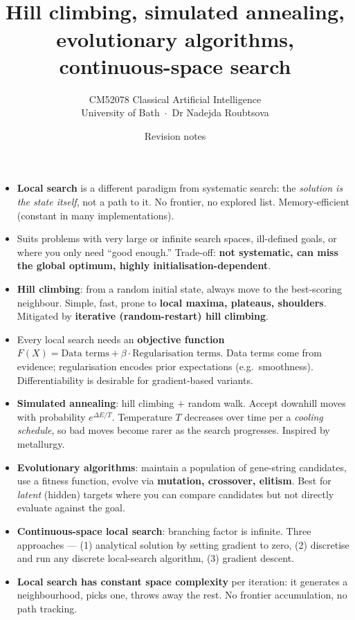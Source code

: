 \documentclass[11pt, a4paper]{article}
\title{\vspace{-1cm}{\Huge\bfseries Week 3 — Local Search Algorithms} \\[0.4em]{\large Hill climbing, simulated annealing, evolutionary algorithms, continuous-space search}}
\author{\large CM52078 Classical Artificial Intelligence \\[0.2em]\normalsize University of Bath \,$\cdot$\, Dr Nadejda Roubtsova}
\date{Revision notes}
\begin{document}
\maketitle
\thispagestyle{empty}

\vspace{1em}

\begin{tldrbox}
\begin{itemize}[leftmargin=*]
  \item \textbf{Local search} is a different paradigm from systematic search: the \emph{solution is the state itself}, not a path to it. No frontier, no explored list. Memory-efficient (constant in many implementations).
  \item Suits problems with very large or infinite search spaces, ill-defined goals, or where you only need ``good enough.'' Trade-off: \textbf{not systematic, can miss the global optimum, highly initialisation-dependent}.
  \item \textbf{Hill climbing}: from a random initial state, always move to the best-scoring neighbour. Simple, fast, prone to \textbf{local maxima, plateaus, shoulders}. Mitigated by \textbf{iterative (random-restart) hill climbing}.
  \item Every local search needs an \textbf{objective function} $F(X) = \text{Data terms} + \beta \cdot \text{Regularisation terms}$. Data terms come from evidence; regularisation encodes prior expectations (e.g.\ smoothness). Differentiability is desirable for gradient-based variants.
  \item \textbf{Simulated annealing}: hill climbing $+$ random walk. Accept downhill moves with probability $e^{\Delta E / T}$. Temperature $T$ decreases over time per a \emph{cooling schedule}, so bad moves become rarer as the search progresses. Inspired by metallurgy.
  \item \textbf{Evolutionary algorithms}: maintain a population of gene-string candidates, use a fitness function, evolve via \textbf{mutation, crossover, elitism}. Best for \emph{latent} (hidden) targets where you can compare candidates but not directly evaluate against the goal.
  \item \textbf{Continuous-space local search}: branching factor is infinite. Three approaches — (1) analytical solution by setting gradient to zero, (2) discretise and run any discrete local-search algorithm, (3) gradient descent.
  \item \textbf{Local search has constant space complexity} per iteration: it generates a neighbourhood, picks one, throws away the rest. No frontier accumulation, no path tracking.
\end{itemize}
\end{tldrbox}
\end{document}

